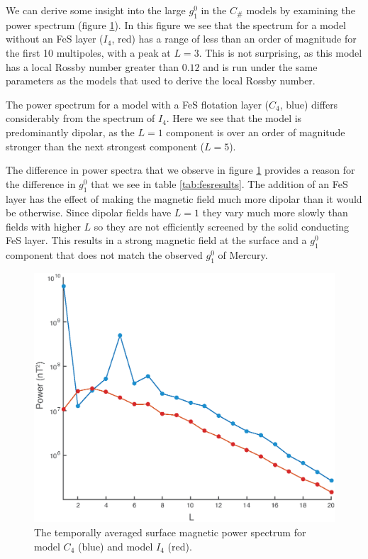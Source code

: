 We can derive some insight into the large $g_1^0$ in the $C_\#$ models by examining the power spectrum (figure \ref{fig:powspec}). In this figure we see that the spectrum for a model without an FeS layer ($I_4$, red) has a range of less than an order of magnitude for the first 10 multipoles, with a peak at $L=3$. This is not surprising, as this model has a local Rossby number greater than $0.12$ and is run under the same parameters as the models that \citet{christensen06scaling} used to derive the local Rossby number.

The power spectrum for a model with a FeS flotation layer ($C_4$, blue) differs considerably from the spectrum of $I_4$. Here we see that the model is predominantly dipolar, as the $L=1$ component is over an order of magnitude stronger than the next strongest component ($L=5$).

The difference in power spectra that we observe in figure \ref{fig:powspec} provides a reason for the difference in $g_1^0$ that we see in table \ref{tab:fesresults}. The addition of an FeS layer has the effect of making the magnetic field much more dipolar than it would be otherwise. Since dipolar fields have $L=1$ they vary much more slowly than fields with higher $L$ so they are not efficiently screened by the solid conducting FeS layer. This results in a strong magnetic field at the surface and a $g_1^0$ component that does not match the observed $g_1^0$ of Mercury. 
\begin{figure}
	\centering
	\includegraphics[width=.8\linewidth]{Chapter5/Figures/PowSpec.eps}

        \caption{The temporally averaged surface magnetic power spectrum for model $C_4$ (blue) and model $I_4$ (red). } 
        \label{fig:powspec}
\end{figure}

